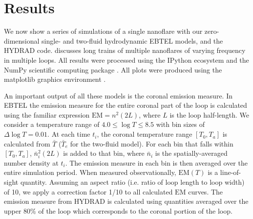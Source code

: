 \documentclass[]{aastex}
\begin{document}
	\section{Results}
	\label{sec:results}
	\par We now show a series of simulations of a single nanoflare with our zero-dimensional single- and two-fluid hydrodynamic EBTEL models, and the HYDRAD code.  discusses long trains of multiple nanoflares of varying frequency in multiple loops. All results were processed using the IPython ecosystem and the NumPy scientific computing package \citep{perez_ipython:_2007,van_der_walt_numpy_2011}. All plots were produced using the matplotlib graphics environment \citep{hunter_matplotlib:_2007}.
	\par An important output of all these models is the coronal emission measure. In EBTEL the emission measure for the entire coronal part of the loop is calculated using the familiar expression $\mathrm{EM}=n^2(2L)$, where $L$ is the loop half-length. We consider a temperature range of $4.0\le\log{T}\le8.5$ with bin sizes of $\Delta\log{T}=0.01$. At each time $t_i$, the coronal temperature range $[T_0,T_a]$ is calculated from $\bar{T}$ ($\bar{T}_e$ for the two-fluid model). For each bin that falls within $[T_0,T_a]$, $\bar{n}_i^2(2L)$ is added to that bin, where $\bar{n}_i$ is the spatially-averaged number density at $t_i$. The emission measure in each bin is then averaged over the entire simulation period. When measured observationally, $\mathrm{EM}(T)$ is a line-of-sight quantity. Assuming an aspect ratio (i.e. ratio of loop length to loop width) of 10, we apply a correction factor 1/10 to all calculated $\mathrm{EM}$ curves. The emission measure from HYDRAD is calculated using quantities averaged over the upper 80\% of the loop which corresponds to the coronal portion of the loop.
\end{document}
